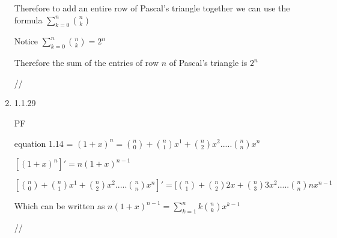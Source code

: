 \documentclass[12pt]{article}
\begin{document}
\begin{enumerate}
{Therefore to add an entire row of Pascal's triangle together we can use the formula $ \sum_{k=0 }^{n}{n \choose k} $

Notice $ \sum_{k=0 }^{n}{n \choose k} = 2^n$

Therefore the sum of the entries of row $n$ of Pascal's triangle is $2^n$


//
}

\item 1.1.29

{
PF

equation 1.14 = $(1+x)^n = {n \choose 0}+{n \choose 1}x^1+{n \choose 2}x^2.....{n \choose n}x^n$

$[(1+x)^n]' = n(1+x)^{n-1}$

$ [{n \choose 0}+{n \choose 1}x^1+{n \choose 2}x^2.....{n \choose n}x^n]' =  
[{n \choose 1}+{n \choose 2}2x+{n \choose 3}3x^2.....{n \choose n}nx^{n-1}$

Which can be written as $ n(1+x)^{n-1} =  \sum_{k=1 }^{n}k{n \choose k} x^{k-1}$


//
}





\end{enumerate}
\end{document}
